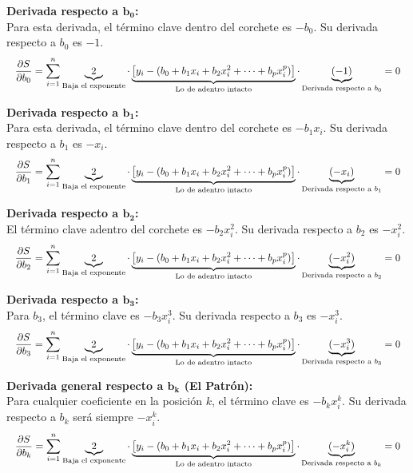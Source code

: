 \documentclass[11pt,a4paper]{article}
\begin{document}
\vspace{0.4cm}
\noindent \textbf{Derivada respecto a $\mathbf{b_0}$:} \\
Para esta derivada, el término clave dentro del corchete es $-b_0$. Su derivada respecto a $b_0$ es $-1$.
\[
\resizebox{\textwidth}{!}{$\displaystyle
\frac{\partial S}{\partial b_0} = \sum_{i=1}^n \underbrace{2}_{\text{Baja el exponente}} \cdot \underbrace{\left[ y_i - (b_0 + b_1 x_i + b_2 x_i^2 + \dots + b_p x_i^p) \right]}_{\text{Lo de adentro intacto}} \cdot \underbrace{(-1)}_{\text{Derivada respecto a } b_0} = 0
$}
\]

\vspace{0.4cm}
\noindent \textbf{Derivada respecto a $\mathbf{b_1}$:} \\
Para esta derivada, el término clave dentro del corchete es $-b_1 x_i$. Su derivada respecto a $b_1$ es $-x_i$.
\[
\resizebox{\textwidth}{!}{$\displaystyle
\frac{\partial S}{\partial b_1} = \sum_{i=1}^n \underbrace{2}_{\text{Baja el exponente}} \cdot \underbrace{\left[ y_i - (b_0 + b_1 x_i + b_2 x_i^2 + \dots + b_p x_i^p) \right]}_{\text{Lo de adentro intacto}} \cdot \underbrace{(-x_i)}_{\text{Derivada respecto a } b_1} = 0
$}
\]

\vspace{0.4cm}
\noindent \textbf{Derivada respecto a $\mathbf{b_2}$:} \\
El término clave adentro del corchete es $-b_2 x_i^2$. Su derivada respecto a $b_2$ es $-x_i^2$.
\[
\resizebox{\textwidth}{!}{$\displaystyle
\frac{\partial S}{\partial b_2} = \sum_{i=1}^n \underbrace{2}_{\text{Baja el exponente}} \cdot \underbrace{\left[ y_i - (b_0 + b_1 x_i + b_2 x_i^2 + \dots + b_p x_i^p) \right]}_{\text{Lo de adentro intacto}} \cdot \underbrace{(-x_i^2)}_{\text{Derivada respecto a } b_2} = 0
$}
\]

\vspace{0.4cm}
\noindent \textbf{Derivada respecto a $\mathbf{b_3}$:} \\
Para $b_3$, el término clave es $-b_3 x_i^3$. Su derivada respecto a $b_3$ es $-x_i^3$.
\[
\resizebox{\textwidth}{!}{$\displaystyle
\frac{\partial S}{\partial b_3} = \sum_{i=1}^n \underbrace{2}_{\text{Baja el exponente}} \cdot \underbrace{\left[ y_i - (b_0 + b_1 x_i + b_2 x_i^2 + \dots + b_p x_i^p) \right]}_{\text{Lo de adentro intacto}} \cdot \underbrace{(-x_i^3)}_{\text{Derivada respecto a } b_3} = 0
$}
\]

\vspace{0.4cm}
\noindent \textbf{Derivada general respecto a $\mathbf{b_k}$ (El Patrón):} \\
Para cualquier coeficiente en la posición $k$, el término clave es $-b_k x_i^k$. Su derivada respecto a $b_k$ será siempre $-x_i^k$.
\[
\resizebox{\textwidth}{!}{$\displaystyle
\frac{\partial S}{\partial b_k} = \sum_{i=1}^n \underbrace{2}_{\text{Baja el exponente}} \cdot \underbrace{\left[ y_i - (b_0 + b_1 x_i + b_2 x_i^2 + \dots + b_p x_i^p) \right]}_{\text{Lo de adentro intacto}} \cdot \underbrace{(-x_i^k)}_{\text{Derivada respecto a } b_k} = 0
$}
\]
\end{document}
